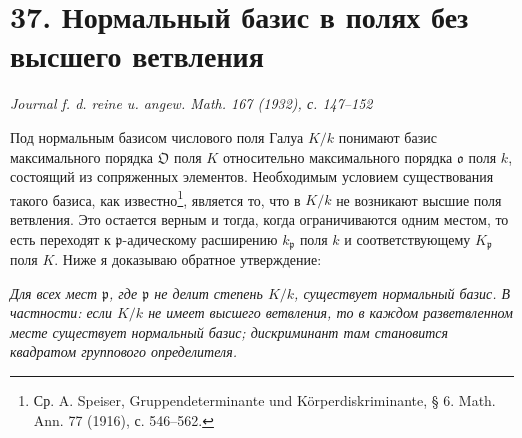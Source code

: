 \documentclass[11pt]{article}
\providecommand{\frakO}{\mathfrak{O}}
\providecommand{\frako}{\mathfrak{o}}
\providecommand{\frakp}{\mathfrak{p}}
\begin{document}
\section*{37. Нормальный базис в полях без высшего ветвления}

\begin{center}
\emph{Journal f. d. reine u. angew. Math. 167 (1932), с. 147--152}
\end{center}

Под нормальным базисом числового поля Галуа \(K/k\) понимают базис максимального порядка \(\frakO\) поля \(K\) относительно максимального порядка \(\frako\) поля \(k\), состоящий из сопряженных элементов. Необходимым условием существования такого базиса, как известно\footnote{Ср. A. Speiser, Gruppendeterminante und Körperdiskriminante, § 6. Math. Ann. 77 (1916), с. 546--562.}, является то, что в \(K/k\) не возникают высшие поля ветвления. Это остается верным и тогда, когда ограничиваются одним местом, то есть переходят к \(\frakp\)-адическому расширению \(k_\frakp\) поля \(k\) и соответствующему \(K_\frakp\) поля \(K\). Ниже я доказываю обратное утверждение:

\emph{Для всех мест \(\frakp\), где \(\frakp\) не делит степень \(K/k\), существует нормальный базис. В частности: если \(K/k\) не имеет высшего ветвления, то в каждом разветвленном месте существует нормальный базис; дискриминант там становится квадратом группового определителя.}
\end{document}
